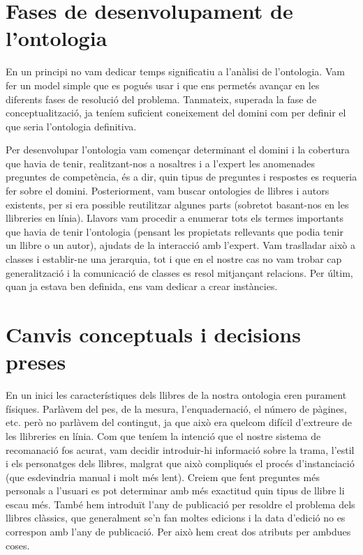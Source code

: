 \label{ontologia}

\section{Fases de desenvolupament de l'ontologia}

En un principi no vam dedicar temps significatiu a l'anàlisi de l'ontologia. Vam fer un model simple que es pogués usar i que ens permetés avançar en les diferents fases de resolució del problema. Tanmateix, superada la fase de conceptualització, ja teníem suficient coneixement del domini com per definir el que seria l'ontologia definitiva.

Per desenvolupar l'ontologia vam començar determinant el domini i la cobertura que havia de tenir, realitzant-nos a nosaltres i a l'expert les anomenades preguntes de competència, és a dir, quin tipus de preguntes i respostes es requeria fer sobre el domini. Posteriorment, vam buscar ontologies de llibres i autors existents, per si era possible reutilitzar algunes parts (sobretot basant-nos en les llibreries en línia). Llavors vam procedir a enumerar tots els termes importants que havia de tenir l'ontologia (pensant les propietats rellevants que podia tenir un llibre o un autor), ajudats de la interacció amb l'expert. Vam traslladar això a classes i establir-ne una jerarquia, tot i que en el nostre cas no vam trobar cap generalització i la comunicació de classes es resol mitjançant relacions. Per últim, quan ja estava ben definida, ens vam dedicar a crear instàncies.

\section{Canvis conceptuals i decisions preses}

En un inici les característiques dels llibres de la nostra ontologia eren purament físiques. Parlàvem del pes, de la mesura, l'enquadernació, el número de pàgines, etc. però no parlàvem del contingut, ja que això era quelcom difícil d'extreure de les llibreries en línia. Com que teníem la intenció que el nostre sistema de recomanació fos acurat, vam decidir introduir-hi informació sobre la trama, l'estil i els personatges dels llibres, malgrat que això compliqués el procés d'instanciació (que esdevindria manual i molt més lent). Creiem que fent preguntes més personals a l'usuari es pot determinar amb més exactitud quin tipus de llibre li escau més. També hem introduït l'any de publicació per resoldre el problema dels llibres clàssics, que generalment se'n fan moltes edicions i la data d'edició no es correspon amb l'any de publicació. Per això hem creat dos atributs per ambdues coses.

